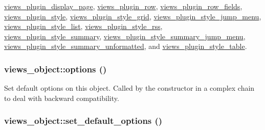 \hyperlink{classviews__plugin__display__page_19b25a55cb43755a944d1f37c0180ff4}{views\_\-plugin\_\-display\_\-page}, \hyperlink{classviews__plugin__row_ad6be1492eae8605e9aff37da9f19337}{views\_\-plugin\_\-row}, \hyperlink{classviews__plugin__row__fields_85538eaa61f4a19de68a693876137934}{views\_\-plugin\_\-row\_\-fields}, \hyperlink{classviews__plugin__style_95b6f2eadf403ff36f1ff2860294b3c2}{views\_\-plugin\_\-style}, \hyperlink{classviews__plugin__style__grid_f20dafba4e79fdb15ff8553d2733552b}{views\_\-plugin\_\-style\_\-grid}, \hyperlink{classviews__plugin__style__jump__menu_6e27e595ed6a3115705f13b76367b637}{views\_\-plugin\_\-style\_\-jump\_\-menu}, \hyperlink{classviews__plugin__style__list_a95419c3a9f3a6db10f6c6858e5c5bd1}{views\_\-plugin\_\-style\_\-list}, \hyperlink{classviews__plugin__style__rss_b65464713d5256b32dbb4eea3e6d76ed}{views\_\-plugin\_\-style\_\-rss}, \hyperlink{classviews__plugin__style__summary_7b016dd1af2076e3cf3199cede83d953}{views\_\-plugin\_\-style\_\-summary}, \hyperlink{classviews__plugin__style__summary__jump__menu_f8b62f282687c9670850c990c376f2c4}{views\_\-plugin\_\-style\_\-summary\_\-jump\_\-menu}, \hyperlink{classviews__plugin__style__summary__unformatted_3bc8b50051e4681461dedb8099f54c24}{views\_\-plugin\_\-style\_\-summary\_\-unformatted}, and \hyperlink{classviews__plugin__style__table_e3d77e484f3e8ff4e2df07dfcfc44aab}{views\_\-plugin\_\-style\_\-table}.\hypertarget{classviews__object_894c01006e88dee15ef867272d22b3ee}{
\subsubsection[{options}]{\setlength{\rightskip}{0pt plus 5cm}views\_\-object::options ()}}
\label{classviews__object_894c01006e88dee15ef867272d22b3ee}


Set default options on this object. Called by the constructor in a complex chain to deal with backward compatibility. \hypertarget{classviews__object_9f3d363b8751bfc945cc29bcf43b44e8}{
\subsubsection[{set\_\-default\_\-options}]{\setlength{\rightskip}{0pt plus 5cm}views\_\-object::set\_\-default\_\-options ()}}
\label{classviews__object_9f3d363b8751bfc945cc29bcf43b44e8}



